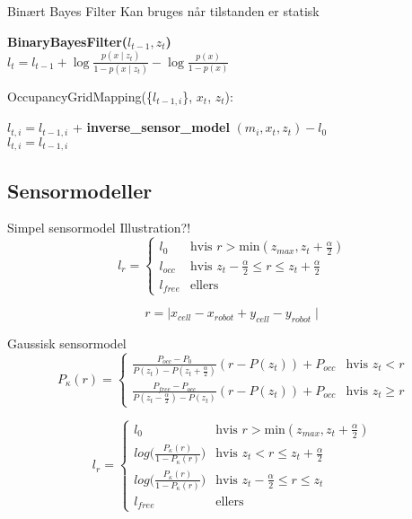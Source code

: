 \begin{frame}{Binært Bayes Filter}
Kan bruges når tilstanden er statisk

\begin{algorithm}[H]
\textbf{BinaryBayesFilter($l_{t-1}, z_t$)} \\
\Indp $l_t = l_{t-1} + \log \frac{p(x \mid z_t)}{1-p(x \mid z_t)} - \log \frac{p(x)}{1-p(x)}$ \\
\end{algorithm}
\end{frame}

\begin{frame}
\begin{algorithm}[H]
OccupancyGridMapping(\{$l_{t-1,i}$\}, $x_t$, $z_t$):

{
{ $ l_{t,i} = l_{t-1,i} $ + \textbf{inverse\_sensor\_model} $( m_i, x_t, z_t ) - l_0$\\ }
{ $ l_{t,i} = l_{t-1,i}  $\\ }
}
\end{algorithm}
\end{frame}

\subsection{Sensormodeller}
\begin{frame}{Simpel sensormodel}
Illustration?!
\[
l_{r} = \begin{cases} 
	l_0 &\text{hvis }r > \text{min}(z_{max},z_t+\frac{\alpha}{2}) \\ 
	l_{occ} &\text{hvis } z_t-\frac{\alpha}{2} \leq r \leq z_t+\frac{\alpha}{2}\\ 
	l_{free} &\text{ellers}  
\end{cases}
\]

\[ r = \mid x_{cell} - x_{robot} + y_{cell} - y_{robot} \mid \]

\end{frame}

\begin{frame}{Gaussisk sensormodel}
\[
	P_\kappa(r) = \begin{cases}
		\frac{P_{occ}-P_0}{P(z_t)-P(z_t+\frac{\alpha}{2})}(r-P(z_t))+P_{occ} &\text{hvis } z_t < r \\
		\frac{P_{free}-P_{occ}}{P(z_t-\frac{\alpha}{2})-P(z_t)}(r-P(z_t))+P_{occ} &\text{hvis } z_t \geq r 
	\end{cases}
\]

\[
	l_{r} = \begin{cases} 
		l_0 &\text{hvis }r > \text{min}(z_{max},z_t+\frac{\alpha}{2}) \\
		log\Big(\frac{P_\kappa(r)}{1-P_\kappa(r)}\Big) &\text{hvis } z_t < r \leq z_t+\frac{\alpha}{2} \\
		log\Big(\frac{P_\kappa(r)}{1-P_\kappa(r)}\Big) &\text{hvis } z_t-\frac{\alpha}{2} \leq r \leq z_t \\
		l_{free} &\text{ellers}	
	\end{cases} 
\]
\end{frame}

